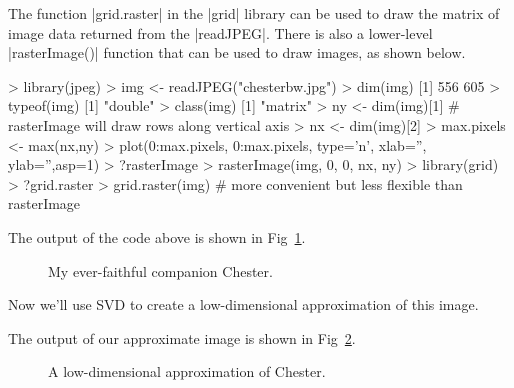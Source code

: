The function |grid.raster| in the |grid| library can be used to draw the matrix of image data returned from the |readJPEG|.  There is also a lower-level |rasterImage()| function that can be used to draw images, as shown below.
%
\begin{R}
> library(jpeg)
> img <- readJPEG("chesterbw.jpg")
> dim(img)
[1] 556 605
> typeof(img)
[1] "double"
> class(img)
[1] "matrix"
> ny <- dim(img)[1]  # rasterImage will draw rows along vertical axis
> nx <- dim(img)[2]
> max.pixels <- max(nx,ny)
> plot(0:max.pixels, 0:max.pixels, type='n', xlab='', ylab='',asp=1)
> ?rasterImage
> rasterImage(img, 0, 0, nx, ny)
> library(grid)
> ?grid.raster
> grid.raster(img)  # more convenient but less flexible than rasterImage
\end{R}
The output of the code above is shown in Fig~\ref{fig:chester}.
\begin{figure}[ht!]
  \caption{My ever-faithful companion Chester.\label{fig:chester}}
\end{figure}


Now we'll use SVD to create a low-dimensional approximation of this image.
%
%
The output of our approximate image is shown in Fig~\ref{fig:chester15}.
\begin{figure}[ht!]
  \caption{A low-dimensional approximation of Chester.\label{fig:chester15}}
\end{figure}


